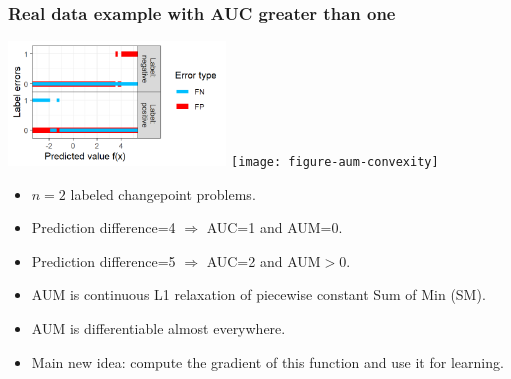 \documentclass[t]{beamer}
\begin{document}
\begin{frame}
  \frametitle{Real data example with AUC greater than one}

  \includegraphics[height=1.3in]{figure-aum-convexity-profiles}
  \texttt{[image: figure-aum-convexity]}

  \begin{itemize}
  \item $n=2$ labeled changepoint problems.
  \item Prediction difference=4 $\Rightarrow$ AUC=1 and AUM=0.
  \item Prediction difference=5 $\Rightarrow$ AUC=2 and AUM$>0$.
  \item AUM is continuous L1 relaxation of piecewise constant Sum of
    Min (SM).
  \item AUM is differentiable almost everywhere.
  \item Main new idea: compute the gradient of this function and use
    it for learning.
  \end{itemize}

\end{frame}
\end{document}
